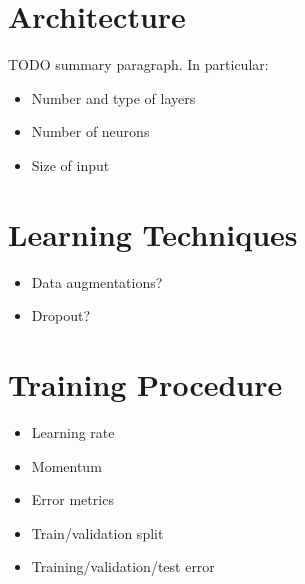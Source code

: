 \documentclass{article}
\begin{document}
\section{Architecture}

TODO summary paragraph. In particular:
\begin{itemize}
\item Number and type of layers
\item Number of neurons
\item Size of input
\end{itemize}

\section{Learning Techniques}
\begin{itemize}
\item Data augmentations?
\item Dropout?
\end{itemize}

\section{Training Procedure}
\begin{itemize}
\item Learning rate
\item Momentum
\item Error metrics
\item Train/validation split
\item Training/validation/test error
\end{itemize}
\end{document}
